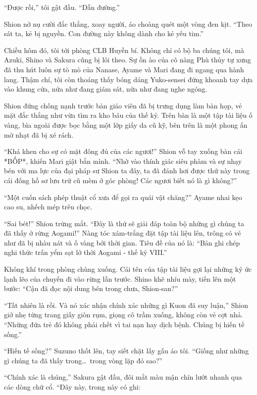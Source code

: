 \documentclass[../main.tex]{subfiles}
\begin{document}
``Được rồi,'' tôi gật đầu. ``Dẫn đường.''

Shion nở nụ cười đắc thắng, xoay người, áo choàng quét một vòng đen kịt. ``Theo sát ta, kẻ bị nguyền. Con đường này không dành cho kẻ yếu tim.''

\ct

Chiều hôm đó, tôi tới phòng CLB Huyền bí. Không chỉ có bộ ba chúng tôi, mà Azuki, Shino và Sakura cũng bị lôi theo. Sự ồn ào của cô nàng Phù thủy tự xưng đã thu hút luôn sự tò mò của Nanase, Ayame và Mari đang đi ngang qua hành lang. Thậm chí, tôi còn thoáng thấy bóng dáng Yuko-sensei đứng khoanh tay dựa vào khung cửa, nửa như đang giám sát, nửa như đang nghe ngóng.

Shion đứng chống nạnh trước bàn giáo viên đã bị trưng dụng làm bàn họp, vẻ mặt đắc thắng như vừa tìm ra kho báu của thế kỷ. Trên bàn là một tập tài liệu ố vàng, bìa ngoài được bọc bằng một lớp giấy da cũ kỹ, bên trên là một phong ấn mờ nhạt đã bị xé rách.

``Khá khen cho sự có mặt đông đủ của các ngươi!'' Shion vỗ tay xuống bàn cái *BỐP*, khiến Mari giật bắn mình. ``Nhờ vào thính giác siêu phàm và sự nhạy bén với ma lực của đại pháp sư Shion ta đây, ta đã đánh hơi được thứ này trong cái đống hồ sơ lưu trữ cũ mèm ở góc phòng! Các ngươi biết nó là gì không?''

``Một cuốn sách phép thuật cổ xưa để gọi ra quái vật chăng?'' Ayame nhai kẹo cao su, nhếch mép trêu chọc.

``Sai bét!'' Shion trừng mắt. ``Đây là thứ sẽ giải đáp toàn bộ những gì chúng ta đã thấy ở rừng Aogami!'' Nàng tóc xám-trắng đặt tập tài liệu lên, trông có vẻ như đã bị nhàu nát và ố vàng bởi thời gian. Tiêu đề của nó là: ``Bản ghi chép nghi thức trấn yểm sạt lở thời Aogami - thế kỷ VIII.''

Không khí trong phòng chùng xuống. Cái tên của tập tài liệu gợi lại những ký ức lạnh lẽo của chuyến đi vào rừng lần trước. Shino khẽ nhíu mày, tiến lên một bước: ``Cậu đã đọc nội dung bên trong chưa, Shion-san?''

``Tất nhiên là rồi. Và nó xác nhận chính xác những gì Kuon đã suy luận,'' Shion giở nhẹ từng trang giấy giòn rụm, giọng cô trầm xuống, không còn vẻ cợt nhả. ``Những đứa trẻ đó không phải chết vì tai nạn hay dịch bệnh. Chúng bị hiến tế sống.''

``Hiến tế sống?'' Suzuno thốt lên, tay siết chặt lấy gấu áo tôi. ``Giống như những gì chúng ta đã thấy trong\dots\ trong vòng lặp đó sao?''

``Chính xác là chúng,'' Sakura gật đầu, đôi mắt màu mận chín lướt nhanh qua các dòng chữ cổ. ``Đây này, trong này có ghi:
\end{document}
